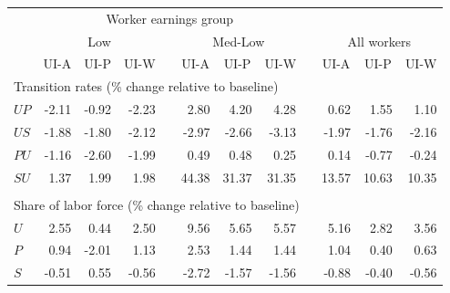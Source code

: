 \begin{tabular}{lrrrrrrrrrrr}
\toprule
      & \multicolumn{7}{c}{Worker earnings group }            &       &       &       &  \\
\cmidrule{2-8}      & \multicolumn{3}{c}{Low} &       & \multicolumn{3}{c}{Med-Low} &       & \multicolumn{3}{c}{All workers} \\
\cmidrule{2-4}\cmidrule{6-8}\cmidrule{10-12}      & \multicolumn{1}{c}{UI-A} & \multicolumn{1}{c}{UI-P} & \multicolumn{1}{c}{UI-W} &       & \multicolumn{1}{c}{UI-A} & \multicolumn{1}{c}{UI-P} & \multicolumn{1}{c}{UI-W} &       & \multicolumn{1}{c}{UI-A} & \multicolumn{1}{c}{UI-P} & \multicolumn{1}{c}{UI-W} \\
\midrule
\multicolumn{12}{l}{Transition rates (\% change relative to baseline)} \\
\quad $UP$ & -2.11 & -0.92 & -2.23 &       & 2.80  & 4.20  & 4.28  &       & 0.62  & 1.55  & 1.10 \\
\quad $US$ & -1.88 & -1.80 & -2.12 &       & -2.97 & -2.66 & -3.13 &       & -1.97 & -1.76 & -2.16 \\
\quad $PU$ & -1.16 & -2.60 & -1.99 &       & 0.49  & 0.48  & 0.25  &       & 0.14  & -0.77 & -0.24 \\
\quad $SU$ & 1.37  & 1.99  & 1.98  &       & 44.38 & 31.37 & 31.35 &       & 13.57 & 10.63 & 10.35 \\
      &       &       &       &       &       &       &       &       &       &       &  \\
\multicolumn{12}{l}{Share of labor force (\% change relative to baseline)} \\
\quad $U$ & 2.55  & 0.44  & 2.50  &       & 9.56  & 5.65  & 5.57  &       & 5.16  & 2.82  & 3.56 \\
\quad $P$ & 0.94  & -2.01 & 1.13  &       & 2.53  & 1.44  & 1.44  &       & 1.04  & 0.40  & 0.63 \\
\quad $S$ & -0.51 & 0.55  & -0.56 &       & -2.72 & -1.57 & -1.56 &       & -0.88 & -0.40 & -0.56 \\
\bottomrule
\end{tabular}%
